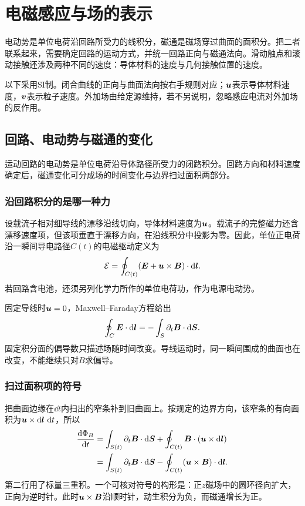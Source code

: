 \chapter{电磁感应与场的表示}
电动势是单位电荷沿回路所受力的线积分，磁通是磁场穿过曲面的面积分。把二者联系起来，需要确定回路的运动方式，并统一回路正向与磁通法向。滑动触点和滚动接触还涉及两种不同的速度：导体材料的速度与几何接触位置的速度。

以下采用SI制。闭合曲线的正向与曲面法向按右手规则对应；$\bm{u}$表示导体材料速度，$\bm{v}$表示粒子速度。外加场由给定源维持，若不另说明，忽略感应电流对外加场的反作用。



\section{回路、电动势与磁通的变化}\label{sec:i1-loop}
运动回路的电动势是单位电荷沿导体路径所受力的闭路积分。回路方向和材料速度确定后，磁通变化可分成场的时间变化与边界扫过面积两部分。

\subsection{沿回路积分的是哪一种力}
设载流子相对细导线的漂移沿线切向，导体材料速度为$\bm{u}$。载流子的完整磁力还含漂移速度项，但该项垂直于漂移方向，在沿线积分中投影为零。因此，单位正电荷沿一瞬间导电路径$C(t)$的电磁驱动定义为
\begin{equation}\label{eq:i1-emf}
\mathcal E=\oint_{C(t)}(\bm{E}+\bm{u}\times\bm{B})\cdot\mathop{}\!\mathrm d\bm{l}.
\end{equation}
若回路含电池，还须另列化学力所作的单位电荷功，作为电源电动势。

固定导线时$\bm{u}=0$，Maxwell--Faraday方程给出
\[\oint_C\bm{E}\cdot\mathop{}\!\mathrm d\bm{l}
=-\int_S\partial_t\bm{B}\cdot\mathop{}\!\mathrm d\bm{S}.
\]
固定积分面的偏导数只描述场随时间改变。导线运动时，同一瞬间围成的曲面也在改变，不能继续只对$B$求偏导。

\subsection{扫过面积项的符号}
把曲面边缘在$\dd t$内扫出的窄条补到旧曲面上。按规定的边界方向，该窄条的有向面积为$\bm{u}\times\mathop{}\!\mathrm d\bm{l}\,\mathop{}\!\mathrm d t$，所以
\[\begin{aligned}
\frac{\mathop{}\!\mathrm d\Phi_B}{\mathop{}\!\mathrm d t}
&=\int_{S(t)}\partial_t\bm{B}\cdot\mathop{}\!\mathrm d\bm{S}
+\oint_{C(t)}\bm{B}\cdot(\bm{u}\times\mathop{}\!\mathrm d\bm{l})\\
&=\int_{S(t)}\partial_t\bm{B}\cdot\mathop{}\!\mathrm d\bm{S}
-\oint_{C(t)}(\bm{u}\times\bm{B})\cdot\mathop{}\!\mathrm d\bm{l}.
\end{aligned}\]
第二行用了标量三重积。一个可核对符号的构形是：正$z$磁场中的圆环径向扩大，正向为逆时针。此时$\bm{u}\times\bm{B}$沿顺时针，动生积分为负，而磁通增长为正。

